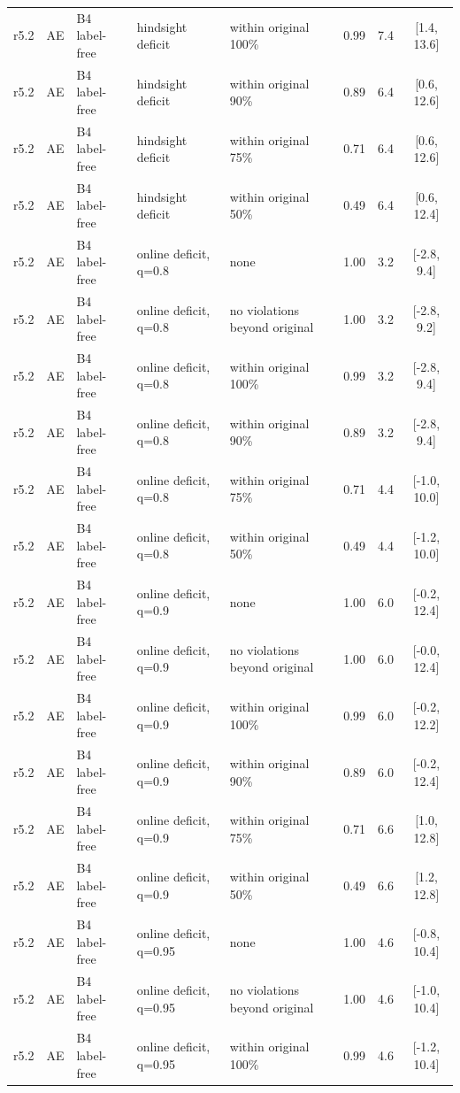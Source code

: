 \begin{longtable}{lllp{4.2cm}p{3.4cm}ccc}
r5.2 & AE & B4 label-free & hindsight deficit & within original 100\% & 0.99 & 7.4 & [1.4, 13.6] \\
r5.2 & AE & B4 label-free & hindsight deficit & within original 90\% & 0.89 & 6.4 & [0.6, 12.6] \\
r5.2 & AE & B4 label-free & hindsight deficit & within original 75\% & 0.71 & 6.4 & [0.6, 12.6] \\
r5.2 & AE & B4 label-free & hindsight deficit & within original 50\% & 0.49 & 6.4 & [0.6, 12.4] \\
r5.2 & AE & B4 label-free & online deficit, q=0.8 & none & 1.00 & 3.2 & [-2.8, 9.4] \\
r5.2 & AE & B4 label-free & online deficit, q=0.8 & no violations beyond original & 1.00 & 3.2 & [-2.8, 9.2] \\
r5.2 & AE & B4 label-free & online deficit, q=0.8 & within original 100\% & 0.99 & 3.2 & [-2.8, 9.4] \\
r5.2 & AE & B4 label-free & online deficit, q=0.8 & within original 90\% & 0.89 & 3.2 & [-2.8, 9.4] \\
r5.2 & AE & B4 label-free & online deficit, q=0.8 & within original 75\% & 0.71 & 4.4 & [-1.0, 10.0] \\
r5.2 & AE & B4 label-free & online deficit, q=0.8 & within original 50\% & 0.49 & 4.4 & [-1.2, 10.0] \\
r5.2 & AE & B4 label-free & online deficit, q=0.9 & none & 1.00 & 6.0 & [-0.2, 12.4] \\
r5.2 & AE & B4 label-free & online deficit, q=0.9 & no violations beyond original & 1.00 & 6.0 & [-0.0, 12.4] \\
r5.2 & AE & B4 label-free & online deficit, q=0.9 & within original 100\% & 0.99 & 6.0 & [-0.2, 12.2] \\
r5.2 & AE & B4 label-free & online deficit, q=0.9 & within original 90\% & 0.89 & 6.0 & [-0.2, 12.4] \\
r5.2 & AE & B4 label-free & online deficit, q=0.9 & within original 75\% & 0.71 & 6.6 & [1.0, 12.8] \\
r5.2 & AE & B4 label-free & online deficit, q=0.9 & within original 50\% & 0.49 & 6.6 & [1.2, 12.8] \\
r5.2 & AE & B4 label-free & online deficit, q=0.95 & none & 1.00 & 4.6 & [-0.8, 10.4] \\
r5.2 & AE & B4 label-free & online deficit, q=0.95 & no violations beyond original & 1.00 & 4.6 & [-1.0, 10.4] \\
r5.2 & AE & B4 label-free & online deficit, q=0.95 & within original 100\% & 0.99 & 4.6 & [-1.2, 10.4] \\

\end{longtable}

